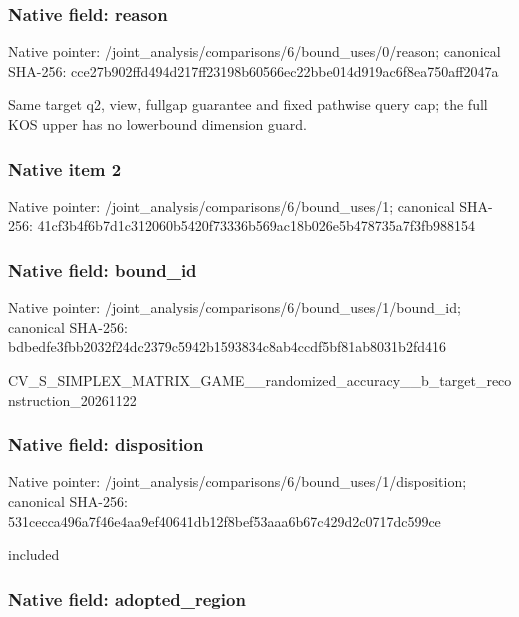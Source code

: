 \documentclass[10pt,a4paper]{article}
\begin{document}
\subsubsection{Native field: reason}


Native pointer: /joint\_analysis/comparis\allowbreak{}ons/6/bound\_uses/0/reaso\allowbreak{}n; canonical SHA-256: cce27b902ffd494d217ff231\allowbreak{}98b60566ec22bbe014d919ac\allowbreak{}6f8ea750aff2047a


Same target q2, view, fullgap guarantee and fixed pathwise query cap; the full KOS upper has no lowerbound dimension guard.


\subsubsection{Native item 2}


Native pointer: /joint\_analysis/comparis\allowbreak{}ons/6/bound\_uses/1; canonical SHA-256: 41cf3b4f6b7d1c312060b542\allowbreak{}0f73336b569ac18b026e5b47\allowbreak{}8735a7f3fb988154



\subsubsection{Native field: bound\_id}


Native pointer: /joint\_analysis/comparis\allowbreak{}ons/6/bound\_uses/1/bound\allowbreak{}\_id; canonical SHA-256: bdbedfe3fbb2032f24dc2379\allowbreak{}c5942b1593834c8ab4ccdf5b\allowbreak{}f81ab8031b2fd416


CV\_S\_SIMPLEX\_MATRIX\_GAME\allowbreak{}\_\_randomized\_accuracy\_\_b\allowbreak{}\_target\_reconstruction\_2\allowbreak{}0261122


\subsubsection{Native field: disposition}


Native pointer: /joint\_analysis/comparis\allowbreak{}ons/6/bound\_uses/1/dispo\allowbreak{}sition; canonical SHA-256: 531cecca496a7f46e4aa9ef4\allowbreak{}0641db12f8bef53aaa6b67c4\allowbreak{}29d2c0717dc599ce


included


\subsubsection{Native field: adopted\_region}
\end{document}
